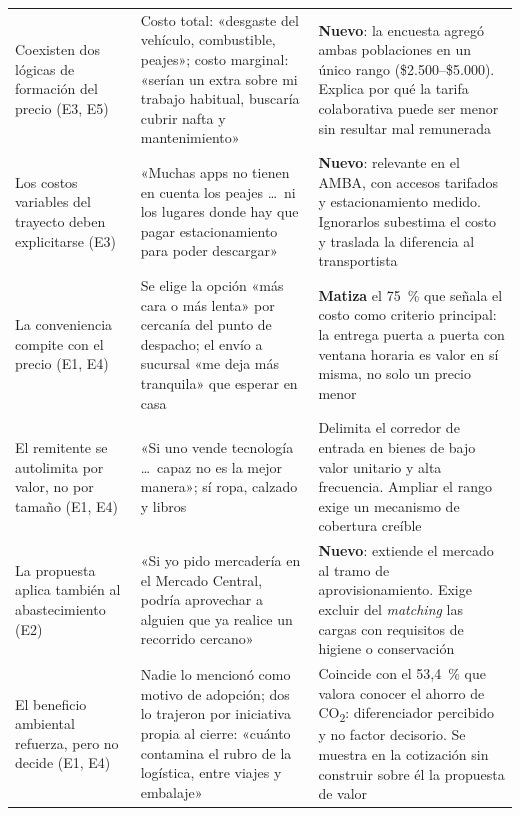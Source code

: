 {\begin{table}[htbp]
\begin{tabular}{p{3.5cm}p{5.1cm}p{5.4cm}}
		\addlinespace
		Coexisten dos lógicas de formación del precio (E3, E5) &
		Costo total: «desgaste del vehículo, combustible, peajes»; costo marginal: «serían un extra sobre mi trabajo habitual, buscaría cubrir nafta y mantenimiento» &
		\textbf{Nuevo}: la encuesta agregó ambas poblaciones en un único rango (\$2.500--\$5.000). Explica por qué la tarifa colaborativa puede ser menor sin resultar mal remunerada \\
		\addlinespace
		Los costos variables del trayecto deben explicitarse (E3) &
		«Muchas apps no tienen en cuenta los peajes \ldots\ ni los lugares donde hay que pagar estacionamiento para poder descargar» &
		\textbf{Nuevo}: relevante en el AMBA, con accesos tarifados y estacionamiento medido. Ignorarlos subestima el costo y traslada la diferencia al transportista \\
		\addlinespace
		La conveniencia compite con el precio (E1, E4) &
		Se elige la opción «más cara o más lenta» por cercanía del punto de despacho; el envío a sucursal «me deja más tranquila» que esperar en casa &
		\textbf{Matiza} el 75~\% que señala el costo como criterio principal: la entrega puerta a puerta con ventana horaria es valor en sí misma, no solo un precio menor \\
		\addlinespace
		El remitente se autolimita por valor, no por tamaño (E1, E4) &
		«Si uno vende tecnología \ldots\ capaz no es la mejor manera»; sí ropa, calzado y libros &
		Delimita el corredor de entrada en bienes de bajo valor unitario y alta frecuencia. Ampliar el rango exige un mecanismo de cobertura creíble \\
		\addlinespace
		La propuesta aplica también al abastecimiento (E2) &
		«Si yo pido mercadería en el Mercado Central, podría aprovechar a alguien que ya realice un recorrido cercano» &
		\textbf{Nuevo}: extiende el mercado al tramo de aprovisionamiento. Exige excluir del \emph{matching} las cargas con requisitos de higiene o conservación \\
		\addlinespace
		El beneficio ambiental refuerza, pero no decide (E1, E4) &
		Nadie lo mencionó como motivo de adopción; dos lo trajeron por iniciativa propia al cierre: «cuánto contamina el rubro de la logística, entre viajes y embalaje» &
		Coincide con el 53,4~\% que valora conocer el ahorro de CO\textsubscript{2}: diferenciador percibido y no factor decisorio. Se muestra en la cotización sin construir sobre él la propuesta de valor \\
		\bottomrule
	\end{tabular}
\end{table}

}
